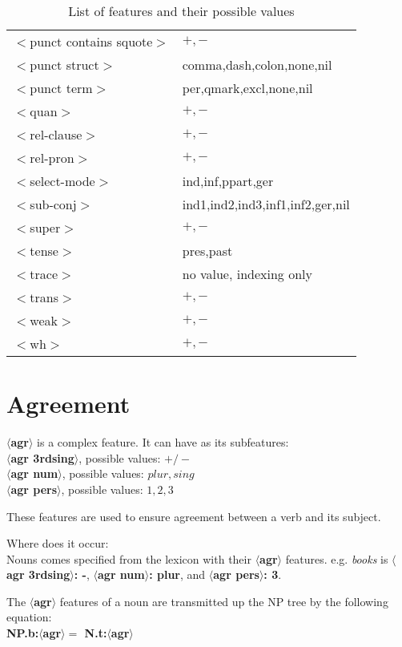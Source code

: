\begin{table}[hbt]
\begin{tabular}{|l|l|}
$<$punct contains squote$>$&$+,-$\\
$<$punct struct$>$&comma,dash,colon,none,nil\\
$<$punct term$>$&per,qmark,excl,none,nil\\
$<$quan$>$&$+,-$\\
$<$rel-clause$>$&$+,-$\\
$<$rel-pron$>$&$+,-$\\
$<$select-mode$>$&ind,inf,ppart,ger\\
$<$sub-conj$>$&ind1,ind2,ind3,inf1,inf2,ger,nil\\
$<$super$>$&$+,-$\\
$<$tense$>$&pres,past\\
$<$trace$>$&no value, indexing only\\
$<$trans$>$&$+,-$\\
$<$weak$>$&$+,-$\\
$<$wh$>$&$+,-$\\
\hline
\end{tabular}
\caption{List of features and their possible values}
\label{feature-table}
\end{table}

\normalsize



\section{Agreement}
{\bf $\langle$agr$\rangle$} is a complex feature.
It can have as its subfeatures:\\
{\bf $\langle$agr 3rdsing$\rangle$}, possible values: {\bf $+/-$ }\\
{\bf $\langle$agr num$\rangle$}, possible values: {\bf $plur,sing$ }\\
{\bf $\langle$agr pers$\rangle$}, possible values: {\bf $1,2,3$ }

These features are used to ensure agreement between a verb and its subject.

Where does it occur:\\
Nouns comes specified from the lexicon with their {\bf $\langle$agr$\rangle$}
features. e.g. {\em books} is {\bf $\langle$agr 3rdsing$\rangle$: -},
{\bf $\langle$agr num$\rangle$: plur}, 
and {\bf $\langle$agr pers$\rangle$: 3}. 

The {\bf $\langle$agr$\rangle$} features of a noun are transmitted up the 
NP tree by the following equation:\\
{\bf NP.b:$\langle$agr$\rangle =$ N.t:$\langle$agr$\rangle$}

